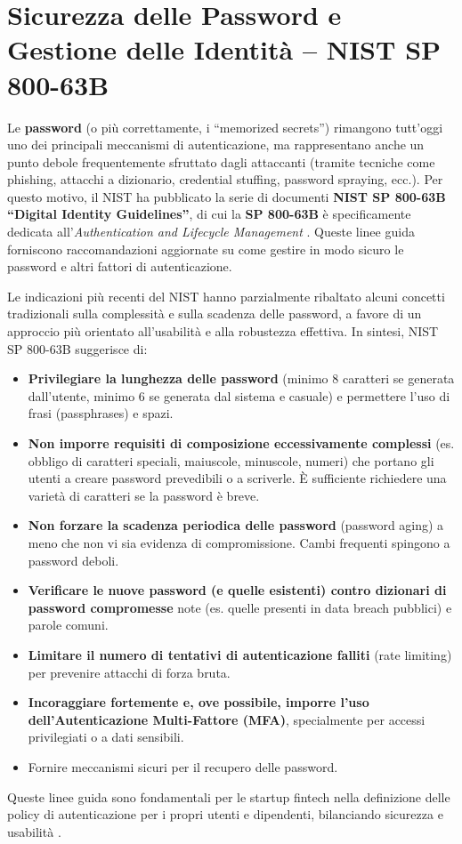 \section{Sicurezza delle Password e Gestione delle Identità – NIST SP 800-63B}
\label{sec:sicurezza_password}
Le \textbf{password} (o più correttamente, i \enquote{memorized secrets}) rimangono tutt'oggi uno dei principali meccanismi di autenticazione, ma rappresentano anche un punto debole frequentemente sfruttato dagli attaccanti (tramite tecniche come phishing, attacchi a dizionario, credential stuffing, password spraying, ecc.). Per questo motivo, il NIST ha pubblicato la serie di documenti \textbf{NIST SP 800-63B \enquote{Digital Identity Guidelines}}, di cui la \textbf{SP 800-63B} è specificamente dedicata all'\textit{Authentication and Lifecycle Management} \cite{NIST_SP_800_63B}. Queste linee guida forniscono raccomandazioni aggiornate su come gestire in modo sicuro le password e altri fattori di autenticazione.

Le indicazioni più recenti del NIST hanno parzialmente ribaltato alcuni concetti tradizionali sulla complessità e sulla scadenza delle password, a favore di un approccio più orientato all'usabilità e alla robustezza effettiva. In sintesi, NIST SP 800-63B suggerisce di:
\begin{itemize}
    \item \textbf{Privilegiare la lunghezza delle password} (minimo 8 caratteri se generata dall'utente, minimo 6 se generata dal sistema e casuale) e permettere l'uso di frasi (passphrases) e spazi.
    \item \textbf{Non imporre requisiti di composizione eccessivamente complessi} (es. obbligo di caratteri speciali, maiuscole, minuscole, numeri) che portano gli utenti a creare password prevedibili o a scriverle. È sufficiente richiedere una varietà di caratteri se la password è breve.
    \item \textbf{Non forzare la scadenza periodica delle password} (password aging) a meno che non vi sia evidenza di compromissione. Cambi frequenti spingono a password deboli.
    \item \textbf{Verificare le nuove password (e quelle esistenti) contro dizionari di password compromesse} note (es. quelle presenti in data breach pubblici) e parole comuni.
    \item \textbf{Limitare il numero di tentativi di autenticazione falliti} (rate limiting) per prevenire attacchi di forza bruta.
    \item \textbf{Incoraggiare fortemente e, ove possibile, imporre l'uso dell'Autenticazione Multi-Fattore (MFA)}, specialmente per accessi privilegiati o a dati sensibili.
    \item Fornire meccanismi sicuri per il recupero delle password.
\end{itemize}
Queste linee guida sono fondamentali per le startup fintech nella definizione delle policy di autenticazione per i propri utenti e dipendenti, bilanciando sicurezza e usabilità \cite{jumpcloudNistPassword}.

